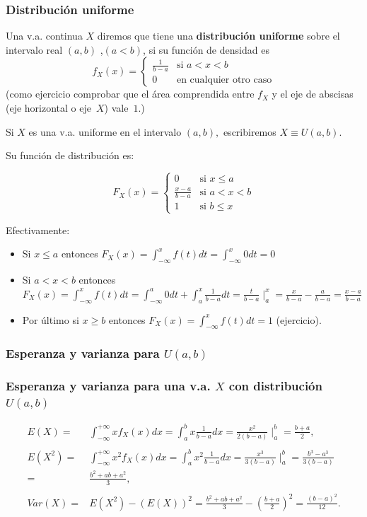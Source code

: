 \begin{frame}
\frametitle{Distribución uniforme}
 Una v.a. continua $X$ diremos que tiene una \textbf{distribución uniforme} sobre el intervalo real
$(a,b)$ ,$(a<b)$, si su función de densidad es
 $$f_X(x)=\left\{\begin{array}{ll}
\frac{1}{b-a} & \mbox{si } a<x<b\\ 0  & \mbox{en cualquier otro caso}
\end{array}
\right. $$ 
(como ejercicio comprobar que el área comprendida entre $f_X$ y el eje de abscisas (eje horizontal o eje~$X$)
vale~$1$.)

Si $X$ es una v.a. uniforme en el intervalo $(a,b),$ escribiremos $X\equiv U(a,b)$.

\end{frame}

\begin{frame}
Su función de distribución es:

$$F_X(x)=\left\{\begin{array}{ll} 0  & \mbox{si } x\leq a\\
\frac{x-a}{b-a} & \mbox{si } a<x<b\\ 1  & \mbox{si } b\leq x
\end{array}
\right. $$

Efectivamente:

\begin{itemize}
    \item Si $x\leq a$ entonces $F_X(x)=\int_{-\infty}^{x} f(t) dt= \int_{-\infty}^{x}
    0 dt =0$
    \item Si $a<x<b$ entonces $F_X(x)=\int_{-\infty}^{x} f(t) dt= \int_{-\infty}^{a}
    0 dt+\int_{a}^{x} \frac{1}{b-a} dt= 
    \frac{t}{b-a}\mid_{a}^{x}=\frac{x}{b-a}-\frac{a}{b-a}=\frac{x-a}{b-a}$
    \item  Por último si $x\geq b$ entonces $F_X(x)=\int_{-\infty}^{x} f(t)
    dt=1$ (ejercicio).
\end{itemize}
\end{frame}

\subsubsection{Esperanza y varianza  para $U(a,b)$}
\begin{frame}
\frametitle{Esperanza y varianza  para  una v.a. $X$ con distribución  $U(a,b)$}
\[
\begin{array}{rl}
E(X)= & \int_{-\infty}^{+\infty} x f_X(x) dx=\int_{a}^{b} x \frac{1}{b-a} dx =
\frac{x^2}{2(b-a)}\mid _{a}^{b}=\frac{b+a}{2}, \\ & \\
E(X^2)= & \int_{-\infty}^{+\infty} x^2 f_X(x) dx=\int_{a}^{b} x^2 \frac{1}{b-a}
dx =\frac{x^3}{3(b-a)}\mid_{a}^{b} =\frac{b^3-a^3}{3(b-a)} \\ = & \frac{b^2+ab+a^2}{3}, \\ & \\
Var(X)= & E(X^2)-(E(X))^2=\frac{b^2+ab+a^2}{3}-(\frac{b+a}{2})^2=\frac{(b-a)^2}{12}.
\end{array}
\]
\end{frame}

